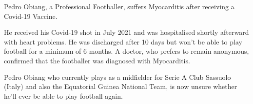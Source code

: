 Pedro Obiang, a Professional Footballer, suffers Myocarditis after receiving a
Covid-19 Vaccine.

He received his Covid-19 shot in July 2021 and was hospitalised shortly
afterward with heart problems. He was discharged after 10 days but won’t be able
to play football for a minimum of 6 months. A doctor, who prefers to remain
anonymous, confirmed that the footballer was diagnosed with Myocarditis.

Pedro Obiang who currently plays as a midfielder for Serie A Club Sassuolo
(Italy) and also the Equatorial Guinea National Team, is now unsure whether
he’ll ever be able to play football again.
